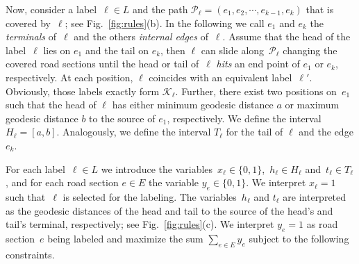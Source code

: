 \documentclass[a4paper,11pt]{article}
\begin{document}
Now, consider a label~$\ell\in L$ and the path $\mathcal
P_\ell=(e_1,e_2,\cdots,e_{k-1},e_k)$ that is covered by~$\ell$; see
Fig.~\ref{fig:rules}(b). In the following we call $e_1$ and $e_k$
the \emph{terminals} of~$\ell$ and the others \emph{internal edges}
of~$\ell$.  Assume that the head of the label~$\ell$ lies on $e_1$ and
the tail on $e_k$, then $\ell$ can slide along~$\mathcal P_\ell$
changing the covered road sections until the head or tail of~$\ell$
\emph{hits} an end point of $e_1$ or $e_k$, respectively. At each
position, $\ell$ coincides with an equivalent
label~$\ell'$. Obviously, those labels exactly form $\mathcal
K_\ell$. Further, there exist two positions on~$e_1$ such that the
head of $\ell$ has either minimum geodesic distance $a$ or maximum
geodesic distance $b$ to the source of $e_1$, respectively. We define
the interval~$H_\ell=[a,b]$. Analogously, we define the interval
$T_\ell$ for the tail of $\ell$ and the edge $e_k$.

 For each label~$\ell \in L$ we introduce
the variables~$x_\ell\in\{0,1\}$,~$h_{\ell}\in H_\ell$
and~$t_{\ell}\in T_\ell$, and for each road section $e\in E$ the
variable $y_e\in\{0,1\}$.  We interpret $x_\ell=1$ such
that~$\ell$ is selected for the labeling. The variables~$h_{\ell}$
and $t_{\ell}$ are interpreted as the geodesic distances of the head
and tail to the source of the head's and tail's terminal, respectively; see
Fig.~\ref{fig:rules}(c). We interpret $y_e=1$ as road section~$e$
being labeled and 
maximize the sum $\sum_{e\in E}y_e$ subject to the following constraints.
\end{document}

